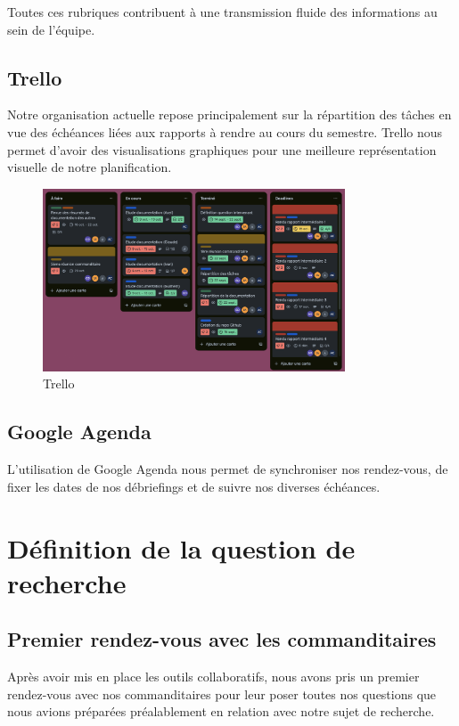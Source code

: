 \documentclass{article}
\begin{document}
\vspace{1.0 cm}
Toutes ces rubriques contribuent à une transmission fluide des informations au sein de l'équipe.

\subsection{Trello}
Notre organisation actuelle repose principalement sur la répartition des tâches en vue des échéances liées aux rapports à rendre au cours du semestre. Trello nous permet d'avoir des visualisations graphiques pour une meilleure représentation visuelle de notre planification. 

\begin{figure}[h]
    \centering
    \includegraphics[width=0.8\textwidth]{trello.png}
    \caption{Trello}
    \label{fig:mon_image}
\end{figure}

\subsection{Google Agenda}
L'utilisation de Google Agenda nous permet de synchroniser nos rendez-vous, de fixer les dates de nos débriefings et de suivre nos diverses échéances. 

\section{Définition de la question de recherche}

\subsection{Premier rendez-vous avec les commanditaires}
Après avoir mis en place les outils collaboratifs, nous avons pris un premier rendez-vous avec nos commanditaires pour leur poser toutes nos questions que nous avions préparées préalablement en relation avec notre sujet de recherche.\\
\end{document}
